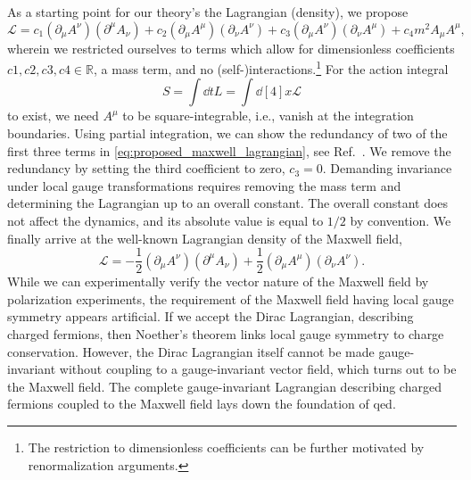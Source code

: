 As a starting point for our theory's the Lagrangian (density), we propose
\begin{equation}
	\mathcal{L}
	=
	c_1
	\left(
		\partial_\mu
		A^\nu
	\right)
	\left(
		\partial^\mu
		A_\nu
	\right)
	+
	c_2
	\left(
		\partial_\mu
		A^\mu
	\right)
	\left(
		\partial_\nu
		A^\nu
	\right)
	+
	c_3
	\left(
		\partial_\mu
		A^\nu
	\right)
	\left(
		\partial_\nu
		A^\mu
	\right)
	+
	c_4
	m^2
	A_\mu A^\mu
	\label{eq:proposed_maxwell_lagrangian_proposal},
\end{equation}
wherein we restricted ourselves to terms which allow for dimensionless coefficients $c1,c2,c3,c4\in\mathbb{R}$, a mass term, and no (self-)interactions.\footnote{The restriction to dimensionless coefficients can be further motivated by renormalization arguments.}
For the action integral
\begin{equation}
	S
	=
	\int\dd{t}
	L
	=
	\int\dd[4]{x}
	\mathcal{L}
\end{equation}
to exist, we need $A^\mu$ to be square-integrable, i.e., vanish at the integration boundaries.
Using partial integration, we can show the redundancy of two of the first three terms in \cref{eq:proposed_maxwell_lagrangian}, see Ref.~\cite{deRham2014}.
We remove the redundancy by setting the third coefficient to zero, $c_3=0$.
Demanding invariance under local gauge transformations requires removing the mass term and determining the Lagrangian up to an overall constant.
The overall constant does not affect the dynamics, and its absolute value is equal to $1/2$ by convention.
We finally arrive at the well-known Lagrangian density of the Maxwell field,
\begin{equation}
	\mathcal{L}
	=
	-
	\frac{1}{2}
	\left(
		\partial_\mu
		A^\nu
	\right)
	\left(
		\partial^\mu
		A_\nu
	\right)
	+
	\frac{1}{2}
	\left(
		\partial_\mu
		A^\mu
	\right)
	\left(
		\partial_\nu
		A^\nu
	\right)
	\label{eq:maxwell_lagrangian_field}
	.
\end{equation}
While we can experimentally verify the vector nature of the Maxwell field by polarization experiments, the requirement of the Maxwell field having local gauge symmetry appears artificial.
If we accept the Dirac Lagrangian, describing charged fermions, then Noether's theorem links local gauge symmetry to charge conservation.
However, the Dirac Lagrangian itself cannot be made gauge-invariant without coupling to a gauge-invariant vector field, which turns out to be the Maxwell field.
The complete gauge-invariant Lagrangian describing charged fermions coupled to the Maxwell field lays down the foundation of \gls{qed}.

